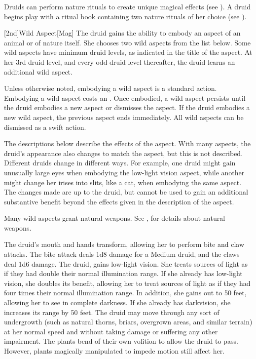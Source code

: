         Druids can perform nature rituals to create unique magical effects (see ).
        A druid begins play with a ritual book containing two nature rituals of her choice (see ).

        [2nd]{Wild Aspect}[Mag]
        The druid gains the ability to embody an aspect of an animal or of nature itself.
        She chooses two wild aspects from the list below.
        Some wild aspects have minimum druid levels, as indicated in the title of the aspect.
        At her 3rd druid level, and every odd druid level thereafter, the druid learns an additional wild aspect.

        Unless otherwise noted, embodying a wild aspect is a standard action.
        Embodying a wild aspect costs an .
        Once embodied, a wild aspect persists until the druid embodies a new aspect or dismisses the aspect.
        If the druid embodies a new wild aspect, the previous aspect ends immediately.
        All wild aspects can be dismissed as a swift action.

        The descriptions below describe the effects of the aspect.
        With many aspects, the druid's appearance also changes to match the aspect, but this is not described.
        Different druids change in different ways.
        For example, one druid might gain unusually large eyes when embodying the low-light vision aspect, while another might change her irises into slits, like a cat, when embodying the same aspect.
        The changes made are up to the druid, but cannot be used to gain an additional substantive benefit beyond the effects given in the description of the aspect.

        Many wild aspects grant natural weapons.
        See , for details about natural weapons.

        The druid's mouth and hands transform, allowing her to perform bite and claw attacks.
        The bite attack deals 1d8 damage for a Medium druid, and the claws deal 1d6 damage.
        The druid, gains low-light vision.
        She treats sources of light as if they had double their normal illumination range.
        If she already has low-light vision, she doubles its benefit, allowing her to treat sources of light as if they had four times their normal illumination range.
        In addition, she gains  out to 50 feet, allowing her to see in complete darkness.
        If she already has darkvision, she increases its range by 50 feet.
        The druid may move through any sort of undergrowth (such as natural thorns, briars, overgrown areas, and similar terrain) at her normal speed and without taking damage or suffering any other impairment.
        The plants bend of their own volition to allow the druid to pass.
        However, plants magically manipulated to impede motion still affect her.

